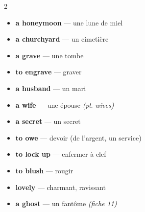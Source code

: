 \documentclass[troisieme]{fiche}
\begin{document}
\begin{multicols}{2}\small
\begin{itemize}[label=--,itemsep=0.8mm,leftmargin=*]
  \item \textbf{a honeymoon} — une lune de miel
  \item \textbf{a churchyard} — un cimetière
  \item \textbf{a grave} — une tombe
  \item \textbf{to engrave} — graver
  \item \textbf{a husband} — un mari
  \item \textbf{a wife} — une épouse \textit{(pl. wives)}
  \item \textbf{a secret} — un secret
  \item \textbf{to owe} — devoir (de l'argent, un service)
  \item \textbf{to lock up} — enfermer à clef
  \item \textbf{to blush} — rougir
  \item \textbf{lovely} — charmant, ravissant
  \item \textbf{a ghost} — un fantôme \textit{(fiche 11)}
\end{itemize}
\end{multicols}
\end{document}
